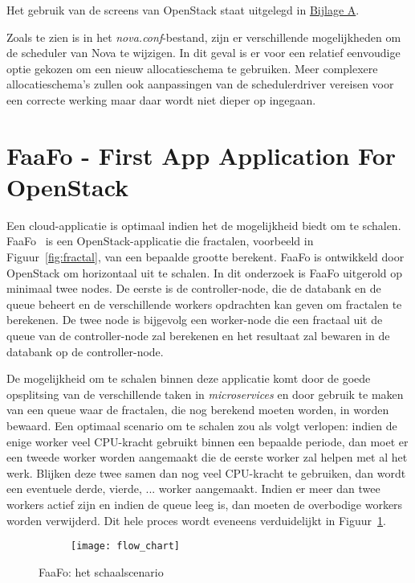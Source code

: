 Het gebruik van de screens van OpenStack staat uitgelegd in \hyperref[att:installation]{Bijlage A}.

Zoals te zien is in het \textit{nova.conf}-bestand, zijn er verschillende mogelijkheden om de scheduler van Nova te wijzigen. In dit geval is er voor een relatief eenvoudige optie gekozen om een nieuw allocatieschema te gebruiken. Meer complexere allocatieschema's zullen ook aanpassingen van de scheduler\textunderscore driver vereisen voor een correcte werking maar daar wordt niet dieper op ingegaan.

\section{FaaFo - First App Application For OpenStack}
\label{sec:faafo}

Een cloud-applicatie is optimaal indien het de mogelijkheid biedt om te schalen. FaaFo~\cite{OpenStack2017j} is een OpenStack-applicatie die fractalen, voorbeeld in Figuur~\ref{fig:fractal}, van een bepaalde grootte berekent. FaaFo is ontwikkeld door OpenStack om horizontaal uit te schalen. In dit onderzoek is FaaFo uitgerold op minimaal twee nodes. De eerste is de controller-node, die de databank en de queue beheert en de verschillende workers opdrachten kan geven om fractalen te berekenen. De twee node is bijgevolg een worker-node die een fractaal uit de queue van de controller-node zal berekenen en het resultaat zal bewaren in de databank op de controller-node.

De mogelijkheid om te schalen binnen deze applicatie komt door de goede opsplitsing van de verschillende taken in \textit{microservices} en door gebruik te maken van een queue waar de fractalen, die nog berekend moeten worden, in worden bewaard. Een optimaal scenario om te schalen zou als volgt verlopen: indien de enige worker veel CPU-kracht gebruikt binnen een bepaalde periode, dan moet er een tweede worker worden aangemaakt die de eerste worker zal helpen met al het werk. Blijken deze twee samen dan nog veel CPU-kracht te gebruiken, dan wordt een eventuele derde, vierde, ... worker aangemaakt. Indien er meer dan twee workers actief zijn en indien de queue leeg is, dan moeten de overbodige workers worden verwijderd. Dit hele proces wordt eveneens verduidelijkt in Figuur~\ref{fig:flow_chart}.

\begin{figure}
  \centering
  \captionsetup{justification=centering}
  \begin{subfigure}{\textwidth}
    \centering
    \centerline{
      \texttt{[image: flow\_chart]}
    }
  \end{subfigure}
  \caption{FaaFo: het schaalscenario}
  \label{fig:flow_chart}
\end{figure}

